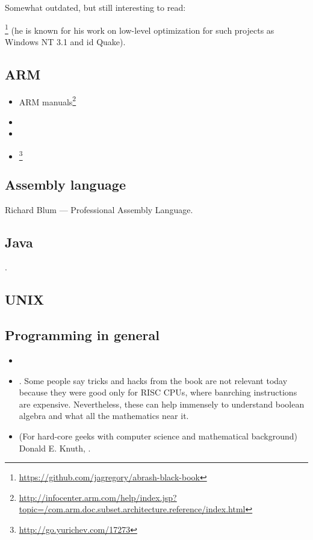 Somewhat outdated, but still interesting to read:

\MAbrash\footnote{\AlsoAvailableAs \url{https://github.com/jagregory/abrash-black-book}}
(he is known for his work on low-level optimization for such projects as Windows NT 3.1 and id Quake).

\subsection{ARM}

\begin{itemize}
\item ARM manuals\footnote{\AlsoAvailableAs \url{http://infocenter.arm.com/help/index.jsp?topic=/com.arm.doc.subset.architecture.reference/index.html}}

\item \ARMSevenRef

\item \ARMSixFourRefURL

\item \ARMCookBook\footnote{\AlsoAvailableAs \url{http://go.yurichev.com/17273}}
\end{itemize}

\subsection{Assembly language}

Richard Blum --- Professional Assembly Language.

\subsection{Java}

\JavaBook.

\subsection{UNIX}

\TAOUP

\subsection{Programming in general}

\begin{itemize}

\item \RobPikePractice

\item \HenryWarren.
Some people say tricks and hacks from the book are not relevant today because they were good only for \ac{RISC} \ac{CPU}s,
where banrching instructions are expensive.
Nevertheless, these can help immensely to understand boolean algebra and what all the mathematics near it.

\item (For hard-core geeks with computer science and mathematical background) Donald E. Knuth, .

\end{itemize}



